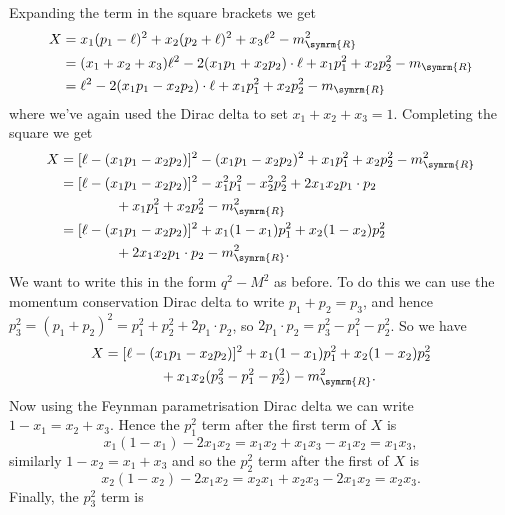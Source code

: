 \documentclass[fleqn]{NotesClass}
\newcommand{\renormalised}{\symrm{R}}
\begin{document}
    Expanding the term in the square brackets we get
    \begin{align}
        X &= x_1(p_1 - \ell)^2 + x_2(p_2 + \ell)^2 + x_3\ell^2 - m_{\renormalised}^2\\
        &= (x_1 + x_2 + x_3)\ell^2 - 2(x_1 p_1 + x_2 p_2) \cdot \ell + x_1p_1^2 + x_2p_2^2 - m_{\renormalised}\\
        &= \ell^2 - 2(x_1 p_1 - x_2 p_2) \cdot \ell + x_1p_1^2 + x_2p_2^2 - m_{\renormalised}
    \end{align}
    where we've again used the Dirac delta to set \(x_1 + x_2 + x_3 = 1\).
    Completing the square we get
    \begin{align}
        X &= [\ell - (x_1 p_1 - x_2 p_2)]^2 - (x_1 p_1 - x_2 p_2)^2 + x_1p_1^2 + x_2 p_2^2 - m_{\renormalised}^2\\
        &= [\ell - (x_1 p_1 - x_2 p_2)]^2 - x_1^2 p_1^2 - x_2^2 p_2^2 + 2x_1x_2 p_1 \cdot p_2 \notag\\
        &\qquad\qquad + x_1 p_1^2 + x_2p_2^2 - m_{\renormalised}^2\\
        &= [\ell - (x_1 p_1 - x_2 p_2)]^2 + x_1(1 - x_1) p_1^2 + x_2(1 - x_2)p_2^2\\
        &\qquad\qquad + 2x_1 x_2 p_1 \cdot p_2 - m_{\renormalised}^2.
    \end{align}
    We want to write this in the form \(q^2 - M^2\) as before.
    To do this we can use the momentum conservation Dirac delta to write \(p_1 + p_2 = p_3\), and hence \(p_3^2 = (p_1 + p_2)^2 = p_1^2 + p_2^2 + 2p_1 \cdot p_2\), so \(2p_1 \cdot p_2 = p_3^2 - p_1^2 - p_2^2\).
    So we have
    \begin{align}
        X &= [\ell - (x_1 p_1 - x_2 p_2)]^2 + x_1(1 - x_1) p_1^2 + x_2(1 - x_2)p_2^2\\
        &\qquad\qquad + x_1x_2 (p_3^2 - p_1^2 - p_2^2) - m_{\renormalised}^2.
    \end{align}
    Now using the Feynman parametrisation Dirac delta we can write \(1 - x_1 = x_2 + x_3\).
    Hence the \(p_1^2\) term after the first term of \(X\) is
    \begin{equation}
        x_1(1 - x_1) - 2x_1x_2 = x_1 x_2 + x_1 x_3 - x_1 x_2 = x_1x_3,
    \end{equation}
    similarly \(1 - x_2 = x_1 + x_3\) and so the \(p_2^2\) term after the first of \(X\) is
    \begin{equation}
        x_2(1 - x_2) - 2x_1x_2 = x_2x_1 + x_2x_3 - 2x_1x_2 = x_2x_3.
    \end{equation}
    Finally, the \(p_3^2\) term is
\end{document}
